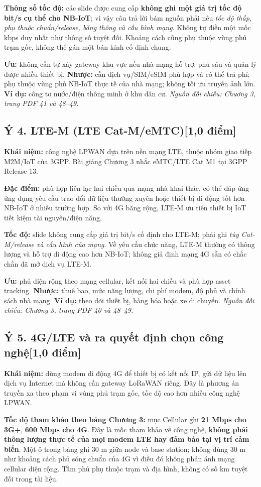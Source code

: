 \documentclass[12pt,a4paper]{article}
\newcommand{\muc}[1]{\subsection*{#1\hfill{\color{teal}\normalsize [1,0 điểm]}}}
\newcommand{\nguon}[1]{{\small\itshape\color{navy}Nguồn đối chiếu: #1.}}
\begin{document}
\textbf{Thông số tốc độ:} các slide được cung cấp \textbf{không ghi một giá trị tốc độ bit/s cụ thể cho NB-IoT}; vì vậy câu trả lời bám nguồn phải nêu \emph{tốc độ thấp, phụ thuộc chuẩn/release, băng thông và cấu hình mạng}. Không tự điền một mốc kbps duy nhất như thông số tuyệt đối. Khoảng cách cũng phụ thuộc vùng phủ trạm gốc, không thể gán một bán kính cố định chung.

\textbf{Ưu:} không cần tự xây gateway khu vực nếu nhà mạng hỗ trợ; phủ sâu và quản lý được nhiều thiết bị. \textbf{Nhược:} cần dịch vụ/SIM/eSIM phù hợp và có thể trả phí; phụ thuộc vùng phủ NB-IoT thực tế của nhà mạng; không tối ưu truyền ảnh lớn. \textbf{Ví dụ:} công tơ nước/điện thông minh ở khu dân cư. \nguon{Chương 3, trang PDF 41 và 48--49}

\muc{Ý 4. LTE-M (LTE Cat-M/eMTC)}
\textbf{Khái niệm:} công nghệ LPWAN dựa trên nền mạng LTE, thuộc nhóm giao tiếp M2M/IoT của 3GPP. Bài giảng Chương 3 nhắc eMTC/LTE Cat M1 tại 3GPP Release 13.

\textbf{Đặc điểm:} phù hợp liên lạc hai chiều qua mạng nhà khai thác, có thể đáp ứng ứng dụng yêu cầu trao đổi dữ liệu thường xuyên hoặc thiết bị di động tốt hơn NB-IoT ở nhiều trường hợp. So với 4G băng rộng, LTE-M ưu tiên thiết bị IoT tiết kiệm tài nguyên/điện năng.

\textbf{Tốc độ:} slide không cung cấp giá trị bit/s cố định cho LTE-M; phải ghi \emph{tùy Cat-M/release và cấu hình của mạng}. Về yêu cầu chức năng, LTE-M thường có thông lượng và hỗ trợ di động cao hơn NB-IoT; không giả định mạng 4G sẵn có chắc chắn đã mở dịch vụ LTE-M.

\textbf{Ưu:} phủ diện rộng theo mạng cellular, kết nối hai chiều và phù hợp asset tracking. \textbf{Nhược:} thuê bao, mức năng lượng, chi phí modem, độ phủ và chính sách nhà mạng. \textbf{Ví dụ:} theo dõi thiết bị, hàng hóa hoặc xe di chuyển. \nguon{Chương 3, trang PDF 40 và 48--49}

\muc{Ý 5. 4G/LTE và ra quyết định chọn công nghệ}
\textbf{Khái niệm:} dùng modem di động 4G để thiết bị có kết nối IP, gửi dữ liệu lên dịch vụ Internet mà không cần gateway LoRaWAN riêng. Đây là phương án truyền xa theo phạm vi vùng phủ trạm gốc, tốc độ cao hơn nhiều công nghệ LPWAN.

\textbf{Tốc độ tham khảo theo bảng Chương 3:} mục Cellular ghi \textbf{21 Mbps cho 3G+}, \textbf{600 Mbps cho 4G}. Đây là mốc tham khảo về công nghệ, \textbf{không phải thông lượng thực tế của mọi modem LTE hay đảm bảo tại vị trí cảm biến}. Một ô trong bảng ghi 30 m giữa node và base station; không dùng 30 m như khoảng cách phủ sóng chuẩn của 4G vì điều đó không phản ánh mạng cellular diện rộng. Tầm phủ phụ thuộc trạm và địa hình, không có số km tuyệt đối trong tài liệu.
\end{document}
